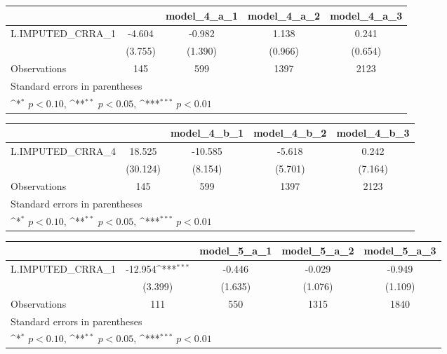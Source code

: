 {
\def\sym#1{\ifmmode^{#1}\else\(^{#1}\)\fi}
\begin{tabular}{l*{4}{c}}
\toprule
                &\multicolumn{1}{c}{}&\multicolumn{1}{c}{model\_4\_a\_1}&\multicolumn{1}{c}{model\_4\_a\_2}&\multicolumn{1}{c}{model\_4\_a\_3}\\
\midrule
L.IMPUTED\_CRRA\_1&   -4.604         &   -0.982         &    1.138         &    0.241         \\
                &  (3.755)         &  (1.390)         &  (0.966)         &  (0.654)         \\
\midrule
Observations    &      145         &      599         &     1397         &     2123         \\
\bottomrule
\multicolumn{5}{l}{\footnotesize Standard errors in parentheses}\\
\multicolumn{5}{l}{\footnotesize \sym{*} \(p<0.10\), \sym{**} \(p<0.05\), \sym{***} \(p<0.01\)}\\
\end{tabular}
}
{
\def\sym#1{\ifmmode^{#1}\else\(^{#1}\)\fi}
\begin{tabular}{l*{4}{c}}
\toprule
                &\multicolumn{1}{c}{}&\multicolumn{1}{c}{model\_4\_b\_1}&\multicolumn{1}{c}{model\_4\_b\_2}&\multicolumn{1}{c}{model\_4\_b\_3}\\
\midrule
L.IMPUTED\_CRRA\_4&   18.525         &  -10.585         &   -5.618         &    0.242         \\
                & (30.124)         &  (8.154)         &  (5.701)         &  (7.164)         \\
\midrule
Observations    &      145         &      599         &     1397         &     2123         \\
\bottomrule
\multicolumn{5}{l}{\footnotesize Standard errors in parentheses}\\
\multicolumn{5}{l}{\footnotesize \sym{*} \(p<0.10\), \sym{**} \(p<0.05\), \sym{***} \(p<0.01\)}\\
\end{tabular}
}
{
\def\sym#1{\ifmmode^{#1}\else\(^{#1}\)\fi}
\begin{tabular}{l*{4}{c}}
\toprule
                &\multicolumn{1}{c}{}&\multicolumn{1}{c}{model\_5\_a\_1}&\multicolumn{1}{c}{model\_5\_a\_2}&\multicolumn{1}{c}{model\_5\_a\_3}\\
\midrule
L.IMPUTED\_CRRA\_1&  -12.954\sym{***}&   -0.446         &   -0.029         &   -0.949         \\
                &  (3.399)         &  (1.635)         &  (1.076)         &  (1.109)         \\
\midrule
Observations    &      111         &      550         &     1315         &     1840         \\
\bottomrule
\multicolumn{5}{l}{\footnotesize Standard errors in parentheses}\\
\multicolumn{5}{l}{\footnotesize \sym{*} \(p<0.10\), \sym{**} \(p<0.05\), \sym{***} \(p<0.01\)}\\
\end{tabular}
}
